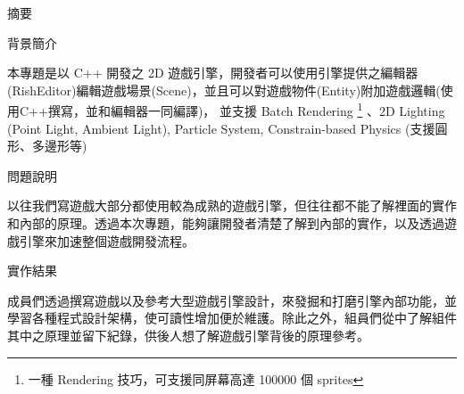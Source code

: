 \begin{Huge}
摘要
\\
\end{Huge}

\begin{Large}
背景簡介
\end{Large}

本專題是以 C++ 開發之 2D 遊戲引擎，開發者可以使用引擎提供之編輯器(RishEditor)編輯遊戲場景(Scene)，並且可以對遊戲物件(Entity)附加遊戲邏輯(使用C++撰寫，並和編輯器一同編譯)，
並支援 Batch Rendering \footnote{一種 Rendering 技巧，可支援同屏幕高達 100000 個 sprites} 、2D Lighting (Point Light, Ambient Light), Particle System, Constrain-based Physics (支援圓形、多邊形等)

\begin{Large}
問題說明
\end{Large}

以往我們寫遊戲大部分都使用較為成熟的遊戲引擎，但往往都不能了解裡面的實作和內部的原理。透過本次專題，能夠讓開發者清楚了解到內部的實作，以及透過遊戲引擎來加速整個遊戲開發流程。

\begin{Large}
實作結果
\end{Large}

成員們透過撰寫遊戲以及參考大型遊戲引擎設計，來發掘和打磨引擎內部功能，並學習各種程式設計架構，使可讀性增加便於維護。除此之外，組員們從中了解組件其中之原理並留下紀錄，供後人想了解遊戲引擎背後的原理參考。

